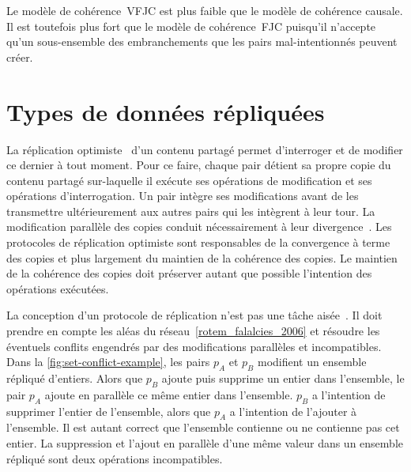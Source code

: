 Le modèle de cohérence~\ac{VFJC} est plus faible que le modèle de cohérence causale.
Il est toutefois plus fort que le modèle de cohérence~\ac{FJC} puisqu'il n'accepte qu'un sous-ensemble des embranchements que les pairs mal-intentionnés peuvent créer.





\section{Types de données répliquées}\label{sec:crdt}

La réplication optimiste~\autocite{saito_2005_optimisticreplication} d'un contenu partagé permet d'interroger et de modifier ce dernier à tout moment.
Pour ce faire, chaque pair détient sa propre copie du contenu partagé sur-laquelle il exécute ses opérations de modification et ses opérations d'interrogation.
Un pair intègre ses modifications avant de les transmettre ultérieurement aux autres pairs qui les intègrent à leur tour.
La modification parallèle des copies conduit nécessairement à leur divergence~\autocite{dourish_1995_divergence}.
Les protocoles de réplication optimiste sont responsables de la convergence à terme des copies et plus largement du maintien de la cohérence des copies.
Le maintien de la cohérence des copies doit préserver autant que possible l'intention des opérations exécutées.

La conception d'un protocole de réplication n'est pas une tâche aisée~\autocite{oster2005_otisuues}.
Il doit prendre en compte les aléas du réseau~\autoref{rotem_falalcies_2006} et résoudre les éventuels conflits engendrés par des modifications parallèles et incompatibles.
Dans la \autoref{fig:set-conflict-example}, les pairs $p_A$ et $p_B$ modifient un ensemble répliqué d'entiers.
Alors que $p_B$ ajoute puis supprime un entier dans l'ensemble, le pair $p_A$ ajoute en parallèle ce même entier dans l'ensemble.
$p_B$ a l'intention de supprimer l'entier de l'ensemble, alors que $p_A$ a l'intention de l'ajouter à l'ensemble.
Il est autant correct que l'ensemble contienne ou ne contienne pas cet entier.
La suppression et l'ajout en parallèle d'une même valeur dans un ensemble répliqué sont deux opérations incompatibles.



